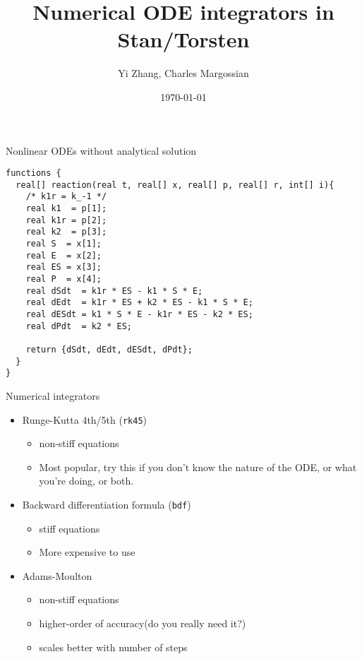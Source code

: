 \documentclass[presentation]{beamer}
\author{Yi Zhang, Charles Margossian}
\date{\today}
\title{Numerical ODE integrators in Stan/Torsten}
\begin{document}
\maketitle

\begin{frame}[fragile,label={sec:org5405190}]{Nonlinear ODEs without analytical solution}
 \begin{verbatim}
functions {
  real[] reaction(real t, real[] x, real[] p, real[] r, int[] i){
    /* k1r = k_-1 */
    real k1  = p[1];
    real k1r = p[2];
    real k2  = p[3];
    real S  = x[1];
    real E  = x[2];
    real ES = x[3];
    real P  = x[4];
    real dSdt  = k1r * ES - k1 * S * E;
    real dEdt  = k1r * ES + k2 * ES - k1 * S * E;
    real dESdt = k1 * S * E - k1r * ES - k2 * ES;
    real dPdt  = k2 * ES;

    return {dSdt, dEdt, dESdt, dPdt};
  }
}
\end{verbatim}
\end{frame}

\begin{frame}[fragile,label={sec:orgd3aa9cd}]{Numerical integrators}
 \begin{itemize}
\item Runge-Kutta 4th/5th (\texttt{rk45})
\begin{itemize}
\item non-stiff equations
\item Most popular, try this if you don't know the nature of the ODE, or what you're doing, or both.
\end{itemize}
\item Backward differentiation formula (\texttt{bdf})
\begin{itemize}
\item stiff equations
\item More expensive to use
\end{itemize}
\item Adams-Moulton
\begin{itemize}
\item non-stiff equations
\item higher-order of accuracy(do you really need it?)
\item scales better with number of steps
\end{itemize}
\end{itemize}
\end{frame}
\end{document}
